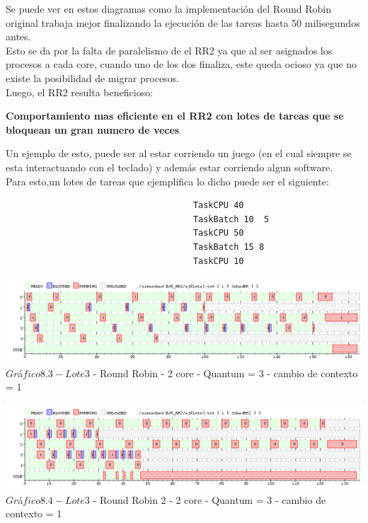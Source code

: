  Se puede ver en estos diagramas como la implementación del Round Robin original trabaja
 mejor finalizando la ejecución de las tareas hasta 50 milisegundos antes.\\
 Esto se da por la falta de paralelismo de el RR2 ya que al ser asignados los procesos
 a cada core, cuando uno de los dos finaliza, este queda ocioso ya que no existe la
 posibilidad de migrar  procesos.\\
 
 Luego, el RR2 resulta beneficioso:
 
 \textbf{Comportamiento mas eficiente en el RR2 con lotes de tareas que se bloquean un gran numero
de veces}

\indent Un ejemplo de esto, puede ser al estar corriendo un juego (en el cual siempre se esta interactuando con el teclado) y
adem\'{a}s estar corriendo algun software.\\

Para esto,un lotes de tareas que ejemplifica lo dicho puede ser el siguiente:\\

\begin{verbatim}
                                     TaskCPU 40
                                     TaskBatch 10  5
                                     TaskCPU 50
                                     TaskBatch 15 8
                                     TaskCPU 10

\end{verbatim}


   \begin{center}
    	\includegraphics[width=450pt]{./EJ8_RR2/dif5corerr.png}
	{$Gr$\'a$fico 8.3 - Lote 3$ - Round Robin - 2 core - Quantum = 3 - cambio de contexto = 1}	
 \end{center}
 
 \begin{center}
    	\includegraphics[width=450pt]{./EJ8_RR2/dif5corerr2.png}
	{$Gr$\'a$fico 8.4 - Lote 3$ - Round Robin 2 - 2 core - Quantum = 3 - cambio de contexto = 1}	
 \end{center}

